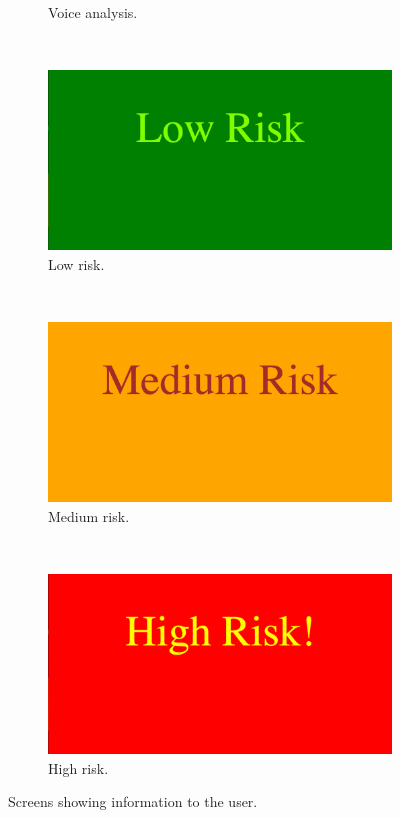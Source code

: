 \documentclass[main.tex]{subfiles}
\begin{document}
\begin{figure}[H]
\begin{subfigure}{0.45\textwidth}
				\caption{Voice analysis.}
				\label{fig:state4}
		\end{subfigure}
		~
		\begin{subfigure}{0.45\textwidth}
				\includegraphics[width=\textwidth]{pics/state6}
				\caption{Low risk.}
				\label{fig:state6}
		\end{subfigure}
		\\
		\begin{subfigure}{0.45\textwidth}
				\includegraphics[width=\textwidth]{pics/state7}
				\caption{Medium risk.}
				\label{fig:state7}
		\end{subfigure}
		~
		\begin{subfigure}{0.45\textwidth}
				\includegraphics[width=\textwidth]{pics/state8}
				\caption{High risk.}
				\label{fig:state8}
		\end{subfigure}
	\caption{Screens showing information to the user.}
	\label{fig:states}
\end{figure}
\end{document}
